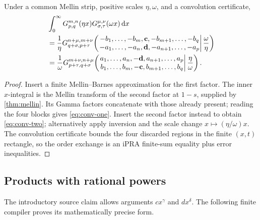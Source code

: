 \begin{theorem}\label{thm:convolution}
Under a common Mellin strip, positive scales $\eta,\omega$, and a convolution
certificate,
\begin{align}
&\int_0^\infty
G_{p,q}^{m,n}(\eta x)G_{\sigma,\tau}^{\mu,\nu}(\omega x)\,\mathrm d x\notag\\
&=\frac1\eta
G_{q+\sigma,p+\tau}^{n+\mu,m+\nu}\!\left(
 \left.\begin{matrix}-b_1,\ldots,-b_m,\mathbf c,-b_{m+1},\ldots,-b_q\\
 -a_1,\ldots,-a_n,\mathbf d,-a_{n+1},\ldots,-a_p
 \end{matrix}\right|\frac\omega\eta\right)\label{eq:conv-one}\\
&=\frac1\omega
G_{p+\tau,q+\sigma}^{m+\nu,n+\mu}\!\left(
 \left.\begin{matrix}a_1,\ldots,a_n,-\mathbf d,a_{n+1},\ldots,a_p\\
 b_1,\ldots,b_m,-\mathbf c,b_{m+1},\ldots,b_q
 \end{matrix}\right|\frac\eta\omega\right).
\label{eq:conv-two}
\end{align}
\end{theorem}
\begin{proof}
Insert a finite Mellin--Barnes approximation for the first factor.  The inner
$x$-integral is the Mellin transform of the second factor at $1-s$, supplied by
\cref{thm:mellin}.  Its Gamma factors concatenate with those already present;
reading the four blocks gives \eqref{eq:conv-one}.  Insert the second factor
instead to obtain \eqref{eq:conv-two}; alternatively apply inversion and the
scale change $x\mapsto(\eta/\omega)x$.  The convolution certificate bounds the
four discarded regions in the finite $(x,t)$ rectangle, so the order exchange
is an iPRA finite-sum equality plus error inequalities.
\end{proof}

\subsection{Products with rational powers}

The introductory source claim allows arguments $cx^\gamma$ and $dx^\delta$.
The following finite compiler proves its mathematically precise form.

